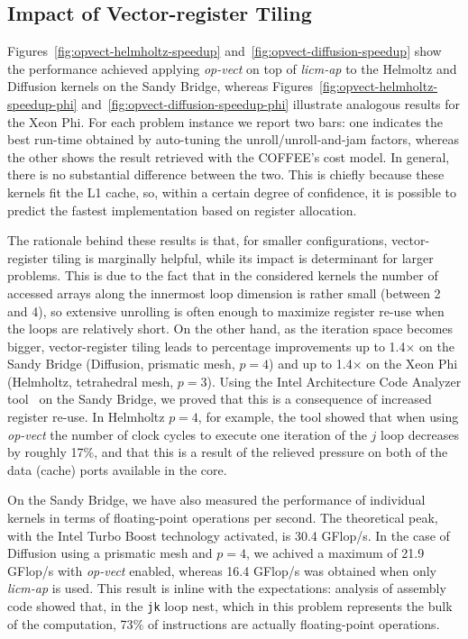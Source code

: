\documentclass[conference]{IEEEtran}
\begin{document}
\subsection{Impact of Vector-register Tiling}
\label{sec:perf-eval-opvect}
Figures~\ref{fig:opvect-helmholtz-speedup} and~\ref{fig:opvect-diffusion-speedup} show the performance achieved applying \emph{op-vect} on top of \emph{licm-ap} to the Helmoltz and Diffusion kernels on the Sandy Bridge, whereas Figures~\ref{fig:opvect-helmholtz-speedup-phi} and~\ref{fig:opvect-diffusion-speedup-phi} illustrate analogous results for the Xeon Phi. For each problem instance we report two bars: one indicates the best run-time obtained by auto-tuning the unroll/unroll-and-jam factors, whereas the other shows the result retrieved with the COFFEE's cost model. In general, there is no substantial difference between the two. This is chiefly because these kernels fit the L1 cache, so, within a certain degree of confidence, it is possible to predict the fastest implementation based on register allocation.

The rationale behind these results is that, for smaller configurations, vector-register tiling is marginally helpful, while its impact is determinant for larger problems. This is due to the fact that in the considered kernels the number of accessed arrays along the innermost loop dimension is rather small (between 2 and 4), so extensive unrolling is often enough to maximize register re-use when the loops are relatively short. On the other hand, as the iteration space becomes bigger, vector-register tiling leads to percentage improvements up to 1.4$\times$ on the Sandy Bridge (Diffusion, prismatic mesh, $p=4$) and up to 1.4$\times$ on the Xeon Phi (Helmholtz, tetrahedral mesh, $p=3$). Using the Intel Architecture Code Analyzer tool~\cite{IACA} on the Sandy Bridge, we proved that this is a consequence of increased register re-use. In Helmholtz $p=4$, for example, the tool showed that when using \emph{op-vect} the number of clock cycles to execute one iteration of the $j$ loop decreases by roughly 17$\%$, and that this is a result of the relieved pressure on both of the data (cache) ports available in the core.

On the Sandy Bridge, we have also measured the performance of individual kernels in terms of floating-point operations per second. The theoretical peak, with the Intel Turbo Boost technology activated, is 30.4 GFlop/s. In the case of Diffusion using a prismatic mesh and $p=4$, we achived a maximum of 21.9 GFlop/s with \emph{op-vect} enabled, whereas 16.4 GFlop/s was obtained when only \emph{licm-ap} is used. This result is inline with the expectations: analysis of assembly code showed that, in the \texttt{jk} loop nest, which in this problem represents the bulk of the computation, 73$\%$ of instructions are actually floating-point operations.
\end{document}
